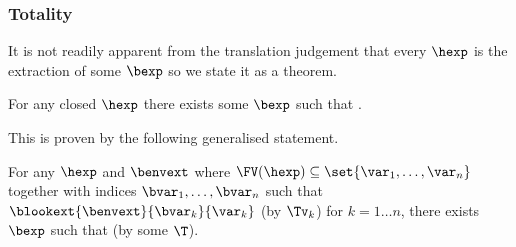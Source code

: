 \subsubsection{Totality}

It is not readily apparent from the translation judgement that every $\hexp$ is the extraction of some $\bexp$ so we state it as a theorem.

\begin{theorem}[Totality]
\label{thm:totality}
For any closed $\hexp$ there exists some $\bexp$ such that \trahb{\hbctx}{\envnil}{\bexp}{\hexp}.
\end{theorem}

This is proven by the following generalised statement.

\begin{lemma}
For any $\hexp$ and $\benvext$ where $\FV(\hexp) \subseteq \set{\var_1, \ldots, \var_n}$ together with indices $\bvar_1, \ldots, \bvar_n$ such that $\blookext{\benvext}{\bvar_k}{\var_k}$ (by $\Tv_k$) for $k = 1 \ldots n$, there exists $\bexp$ such that \trahb{\hbctx}{\benvext}{\bexp}{\hexp} (by some $\T$).
\end{lemma}

